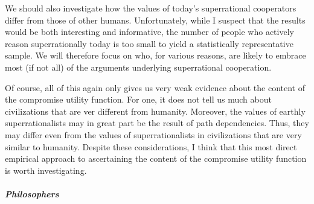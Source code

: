 We should also investigate how the values of today's superrational
cooperators differ from those of other humans. Unfortunately, while I
suspect that the results would be both interesting and informative, the
number of people who actively reason superrationally today is too small
to yield a statistically representative sample. We will therefore focus
on who, for various reasons, are likely to embrace most (if not all) of
the arguments underlying superrational cooperation.

Of course, all of this again only gives us very weak evidence about the
content of the compromise utility function. For one, it does not tell us
much about civilizations that are ver different from humanity. Moreover,
the values of earthly superrationalists may in great part be the result
of path dependencies. Thus, they may differ even from the values of
superrationalists in civilizations that are very similar to humanity.
Despite these considerations, I think that this most direct empirical
approach to ascertaining the content of the compromise utility function
is worth investigating.

\subparagraph{Philosophers}\label{philosophers}

